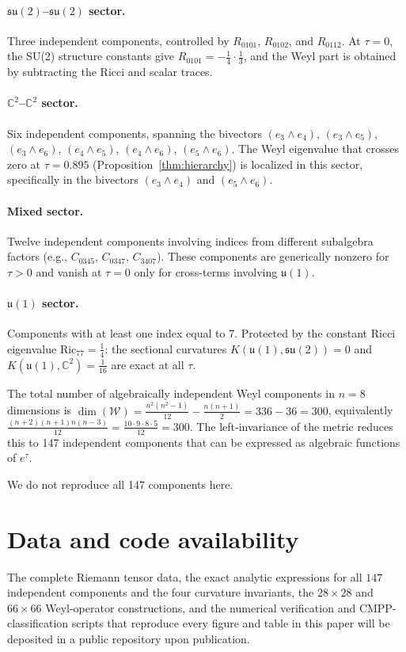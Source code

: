 \documentclass[12pt]{article}
\theoremstyle{definition}
\theoremstyle{remark}
\begin{document}
\paragraph{$\mathfrak{su}(2)$--$\mathfrak{su}(2)$ sector.}  Three independent components, controlled by $R_{0101}$, $R_{0102}$, and $R_{0112}$.  At $\tau=0$, the SU(2) structure constants give $R_{0101}=-\frac{1}{4}\cdot\frac{1}{3}$, and the Weyl part is obtained by subtracting the Ricci and scalar traces.

\paragraph{$\mathbb{C}^2$--$\mathbb{C}^2$ sector.}  Six independent components, spanning the bivectors $(e_3\wedge e_4)$, $(e_3\wedge e_5)$, $(e_3\wedge e_6)$, $(e_4\wedge e_5)$, $(e_4\wedge e_6)$, $(e_5\wedge e_6)$.  The Weyl eigenvalue that crosses zero at $\tau=0.895$ (Proposition~\ref{thm:hierarchy}) is localized in this sector, specifically in the bivectors $(e_3\wedge e_4)$ and $(e_5\wedge e_6)$.

\paragraph{Mixed sector.}  Twelve independent components involving indices from different subalgebra factors (e.g., $C_{0345}$, $C_{0347}$, $C_{3407}$).  These components are generically nonzero for $\tau>0$ and vanish at $\tau=0$ only for cross-terms involving $\mathfrak{u}(1)$.

\paragraph{$\mathfrak{u}(1)$ sector.}  Components with at least one index equal to 7.  Protected by the constant Ricci eigenvalue $\mathrm{Ric}_{77}=\frac{1}{4}$: the sectional curvatures $K(\mathfrak{u}(1),\mathfrak{su}(2))=0$ and $K(\mathfrak{u}(1),\mathbb{C}^2)=\frac{1}{16}$ are exact at all $\tau$.

The total number of algebraically independent Weyl components in $n=8$ dimensions is $\dim(\mathcal{W})=\frac{n^2(n^2-1)}{12}-\frac{n(n+1)}{2} = 336-36 = 300$, equivalently $\frac{(n+2)(n+1)n(n-3)}{12}=\frac{10\cdot9\cdot8\cdot5}{12}=300$.  The left-invariance of the metric reduces this to 147 independent components that can be expressed as algebraic functions of $e^\tau$.

We do not reproduce all 147 components here.

\section*{Data and code availability}

The complete Riemann tensor data, the exact analytic expressions for all $147$ independent components and the four curvature invariants, the $28\times28$ and $66\times66$ Weyl-operator constructions, and the numerical verification and CMPP-classification scripts that reproduce every figure and table in this paper will be deposited in a public repository upon publication.



\end{document}
